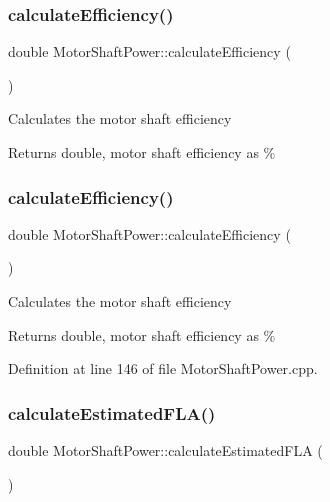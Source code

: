 \subsubsection{\texorpdfstring{calculate\+Efficiency()}{calculateEfficiency()}\hspace{0.1cm}{\footnotesize\ttfamily [2/3]}}
{\footnotesize\ttfamily double Motor\+Shaft\+Power\+::calculate\+Efficiency (\begin{DoxyParamCaption}{ }\end{DoxyParamCaption})}

Calculates the motor shaft efficiency

\begin{DoxyReturn}{Returns}
double, motor shaft efficiency as \% 
\end{DoxyReturn}
\mbox{\label{class_motor_shaft_power_ab7df0b41dc9d1bc6a591f0ab8f57b7ee}} 
\subsubsection{\texorpdfstring{calculate\+Efficiency()}{calculateEfficiency()}\hspace{0.1cm}{\footnotesize\ttfamily [3/3]}}
{\footnotesize\ttfamily double Motor\+Shaft\+Power\+::calculate\+Efficiency (\begin{DoxyParamCaption}{ }\end{DoxyParamCaption})}

Calculates the motor shaft efficiency

\begin{DoxyReturn}{Returns}
double, motor shaft efficiency as \% 
\end{DoxyReturn}


Definition at line 146 of file Motor\+Shaft\+Power.\+cpp.

\mbox{\label{class_motor_shaft_power_a120b76be1b3b9fc3d67e37ecee0eb767}} 
\subsubsection{\texorpdfstring{calculate\+Estimated\+F\+L\+A()}{calculateEstimatedFLA()}\hspace{0.1cm}{\footnotesize\ttfamily [1/3]}}
{\footnotesize\ttfamily double Motor\+Shaft\+Power\+::calculate\+Estimated\+F\+LA (\begin{DoxyParamCaption}{ }\end{DoxyParamCaption})}

